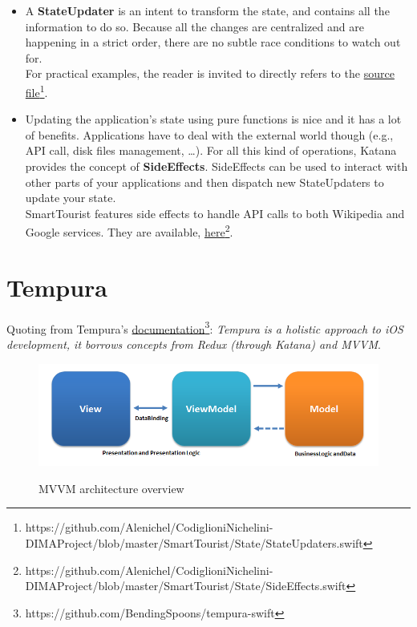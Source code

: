 \documentclass[a4paper, 11pt, parskip=half]{scrreprt}
\theoremstyle{definition}
\begin{document}
\begin{itemize}
	\item A \textbf{StateUpdater} is an intent to transform the state, and contains all the information to do so. Because all the changes are centralized and are happening in a strict order, there are no subtle race conditions to watch out for.
		\\For practical examples, the reader is invited to directly refers to the \href{https://github.com/Alenichel/CodiglioniNichelini-DIMAProject/blob/master/SmartTourist/State/StateUpdaters.swift}{source file}\footnote{https://github.com/Alenichel/CodiglioniNichelini-DIMAProject/blob/master/SmartTourist/State/StateUpdaters.swift}.	 
	\item Updating the application's state using pure functions is nice and it has a lot of benefits. Applications have to deal with the external world though (e.g., API call, disk files management, …). For all this kind of operations, Katana provides the concept of \textbf{SideEffects}. SideEffects can be used to interact with other parts of your applications and then dispatch new StateUpdaters to update your state.
		\\SmartTourist features side effects to handle API calls to both Wikipedia and Google services. They are available, \href{https://github.com/Alenichel/CodiglioniNichelini-DIMAProject/blob/master/SmartTourist/State/SideEffects.swift}{here}\footnote{https://github.com/Alenichel/CodiglioniNichelini-DIMAProject/blob/master/SmartTourist/State/SideEffects.swift}.
\end{itemize}


\section{Tempura}
Quoting from Tempura's \href{https://github.com/BendingSpoons/tempura-swift}{documentation}\footnote{https://github.com/BendingSpoons/tempura-swift}: \textit{Tempura is a holistic approach to iOS development, it borrows concepts from Redux (through Katana) and MVVM}.

\begin{figure}[H]
  	\centering
  	\includegraphics[width=0.9\linewidth]{mvvm}
  	\label{fig:test1}
	\caption{MVVM architecture overview}
\end{figure}
\end{document}

